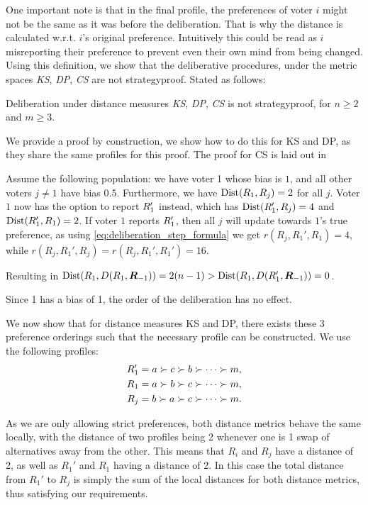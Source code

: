 One important note is that in the final profile, the
preferences of voter \(i\) might not be the same as it was
before the deliberation. That is why the distance is calculated
w.r.t. \(i\)'s original preference. Intuitively this could be
read as \(i\) misreporting their preference to prevent even
their own mind from being changed. Using this definition, we
show that the deliberative procedures, under the metric spaces
\emph{KS}, \emph{ DP}, \emph{ CS} are not strategyproof. Stated
as follows:

\begin{proposition} Deliberation under distance measures
	\emph{KS}, \emph{ DP}, \emph{ CS} is not strategyproof, for $n
		\geq 2$ and $m \geq 3$. \end{proposition} We provide a proof by
construction, we show how to do this for KS and DP, as they share the
same profiles for this proof. The proof for CS is laid out in
 \begin{proofc} Assume the following population: we
	have voter 1 whose bias is $1$, and all other voters $j \neq 1$
	have bias $0.5$. Furthermore, we have
	$\operatorname{Dist}(R_1, R_j) = 2$ for all
	$j$. Voter $1$ now has the option to report $R_{1}'$
	instead, which has $\operatorname{Dist}(R_{1}',
		R_j) = 4$ and $\operatorname{Dist}(R_{1}',
		R_1) = 2$. If voter $1$ reports $R_1'$,
	then all $j$ will update towards $1$'s true preference, as
	using \cref{eq:deliberation_step_formula} we get $r(R_{j},
		R_{1}', R_1) = 4$, while $r(R_{j}, R_{1}', R_j) = r(R_{j},
		R_{1}', R_1') = 16$.

	Resulting in $\operatorname{Dist}(R_{1},
		D(R_{1},\boldsymbol{R}_{-1})) = 2(n-1) >
		\operatorname{Dist}(R_{1}, D(R_{1}', \boldsymbol{R}_{-1})) =
		0$.

	Since 1 has a bias of 1, the order of the deliberation has no
	effect.

	We now show that for distance measures KS and DP, there exists
	these 3 preference orderings such that the necessary profile
	can be constructed. We use the following profiles: \[
		\begin{aligned} R_{1}' & = a \succ c \succ b \succ
                \cdots \succ m,                    \\ R_{1}  & = a \succ b \succ c
                \succ \cdots \succ m,              \\ R_{j}  & = b \succ a \succ c
                \succ \cdots \succ m.              \\\end{aligned} \]

	As we are only allowing strict preferences, both distance metrics
behave the same locally, with the distance of two profiles being 2 whenever one
is 1 swap of alternatives away from the other. This means that  \(R_{i}\) and
\(R_{j}\) have a distance of 2, as well as  \(R_{1}'\) and \(R_{1}\) having a
distance of 2. In this case the total distance from \(R_{1}'\) to \(R_{j}\) is
simply the sum of the local distances for both distance metrics, thus
satisfying our requirements.\hfill \end{proofc}


